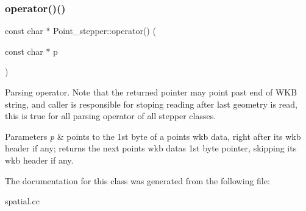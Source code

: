 \subsubsection{\texorpdfstring{operator()()}{operator()()}}
{\footnotesize\ttfamily const char $\ast$ Point\+\_\+stepper\+::operator() (\begin{DoxyParamCaption}\item[{const char $\ast$}]{p }\end{DoxyParamCaption})}

Parsing operator. Note that the returned pointer may point past end of W\+KB string, and caller is responsible for stoping reading after last geometry is read, this is true for all parsing operator of all stepper classes. 
\begin{DoxyParams}{Parameters}
{\em p} & points to the 1st byte of a point\textquotesingle{}s wkb data, right after its wkb header if any; returns the next point\textquotesingle{}s wkb data\textquotesingle{}s 1st byte pointer, skipping its wkb header if any. \\
\hline
\end{DoxyParams}


The documentation for this class was generated from the following file\+:\begin{DoxyCompactItemize}
\item 
spatial.\+cc\end{DoxyCompactItemize}
